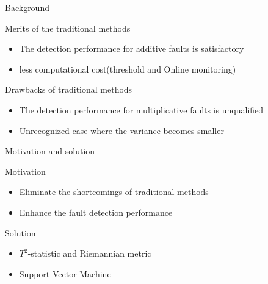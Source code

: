\documentclass[10pt]{beamer}
\begin{document}
\begin{frame}{Background}
 \begin{exampleblock}{Merits of the traditional methods}
	\begin{itemize}
    \item The detection performance for additive faults is satisfactory
    \item less computational cost(threshold and Online monitoring)
    \end{itemize}
    \end{exampleblock}
    \begin{exampleblock}{Drawbacks of traditional methods}
      \begin{itemize}
      \item The detection performance for multiplicative faults is unqualified
      \item Unrecognized case where the variance becomes smaller
 	 \end{itemize}  
 	 \end{exampleblock}
\end{frame}

\begin{frame}{Motivation and solution}
\begin{exampleblock}{Motivation}
      \begin{itemize}
      \item Eliminate the shortcomings of traditional methods
      \item Enhance the fault detection performance
 	 \end{itemize}  
 	 \end{exampleblock}
 \begin{exampleblock}{Solution}
      \begin{itemize}
      \item $T^2$-statistic and Riemannian metric
      \item Support Vector Machine
 	 \end{itemize}  
 	 \end{exampleblock}

\end{frame}
\end{document}
